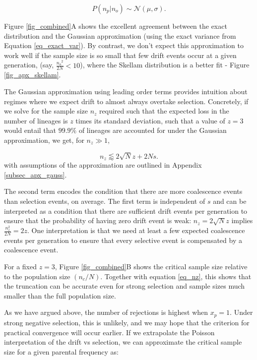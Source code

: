 \documentclass[review]{elsarticle}
\begin{document}
\begin{equation}
  P(n_p|n_o) \sim \mathcal{N}(\mu, \sigma).
  \label{eq_gaussian}
\end{equation}

Figure \ref{fig_combined}A shows the excellent agreement between the exact distribution and the
Gaussian approximation (using the exact variance from Equation \ref{eq_exact_var}). By contrast,
we don't expect this approximation to work well if the sample size is so small that few drift
events occur at a given generation, (say, $\frac{{n_o}^2}{2N} < 10$), where the Skellam
distribution is a better fit - Figure \ref{fig_apx_skellam}.
 
The Gaussian approximation using leading order terms provides intuition about regimes where we
expect drift to almost always overtake selection.  Concretely, if we solve for the sample size
$n_z$ required such that the expected loss in the number of lineages is $z$ times its standard deviation,
such that a value of $z=3$ would entail that $99.9\%$ of lineages are accounted for under the Gaussian approximation,
we get, for $n_z\gg 1$,

\begin{equation}
  n_z \lessapprox 2 \sqrt{N} z + 2N s.
\label{eq_nz}
\end{equation}
with assumptions of the approximation are outlined in Appendix \ref{subsec_apx_gauss}. 

The second term
encodes the condition that there are more coalescence events than selection events, on average. The
first term is independent of $s$ and can be interpreted as a condition that there are sufficient
drift events per generation to ensure that the probability of having zero drift event is weak: $n_z
= 2 \sqrt N z$ implies $\frac{n_z^2}{2N}= 2 z$. One interpretation is that we need at least a few
expected coalescence events per generation to ensure that every selective event is compensated by a
coalescence event. 

 For a fixed $z=3$, Figure \ref{fig_combined}B shows the critical sample size relative to the population size 
 $(n_c/N)$. Together with equation \ref{eq_nz}, this shows
that the truncation can be accurate even for strong selection and sample sizes much smaller than
the full population size. 

As we have argued above, the number of rejections is highest when $x_p=1$. 
Under strong  negative selection, this is unlikely, and we may hope that the
criterion for practical convergence will occur earlier. 
If we extrapolate the Poisson interpretation of the drift vs selection, 
we can approximate the critical sample size for a given parental frequency as:
\end{document}
